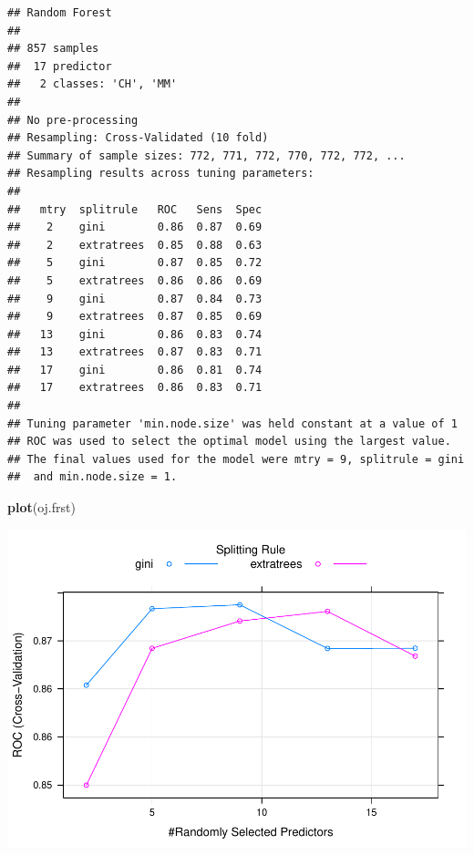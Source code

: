 \documentclass[
]{book}
\newenvironment{Shaded}{\begin{snugshade}}{\end{snugshade}}
\newcommand{\DataTypeTok}[1]{\textcolor[rgb]{0.13,0.29,0.53}{#1}}
\newcommand{\KeywordTok}[1]{\textcolor[rgb]{0.13,0.29,0.53}{\textbf{#1}}}
\newcommand{\NormalTok}[1]{#1}
\newcommand{\OperatorTok}[1]{\textcolor[rgb]{0.81,0.36,0.00}{\textbf{#1}}}
\newcommand{\StringTok}[1]{\textcolor[rgb]{0.31,0.60,0.02}{#1}}
\begin{document}
\begin{verbatim}
## Random Forest 
## 
## 857 samples
##  17 predictor
##   2 classes: 'CH', 'MM' 
## 
## No pre-processing
## Resampling: Cross-Validated (10 fold) 
## Summary of sample sizes: 772, 771, 772, 770, 772, 772, ... 
## Resampling results across tuning parameters:
## 
##   mtry  splitrule   ROC   Sens  Spec
##    2    gini        0.86  0.87  0.69
##    2    extratrees  0.85  0.88  0.63
##    5    gini        0.87  0.85  0.72
##    5    extratrees  0.86  0.86  0.69
##    9    gini        0.87  0.84  0.73
##    9    extratrees  0.87  0.85  0.69
##   13    gini        0.86  0.83  0.74
##   13    extratrees  0.87  0.83  0.71
##   17    gini        0.86  0.81  0.74
##   17    extratrees  0.86  0.83  0.71
## 
## Tuning parameter 'min.node.size' was held constant at a value of 1
## ROC was used to select the optimal model using the largest value.
## The final values used for the model were mtry = 9, splitrule = gini
##  and min.node.size = 1.
\end{verbatim}

\begin{Shaded}
\begin{Highlighting}[]
\KeywordTok{plot}\NormalTok{(oj.frst)}
\end{Highlighting}
\end{Shaded}

\includegraphics{data-sci_files/figure-latex/unnamed-chunk-115-1.pdf}

\begin{Shaded}
\end{Shaded}
\end{document}
